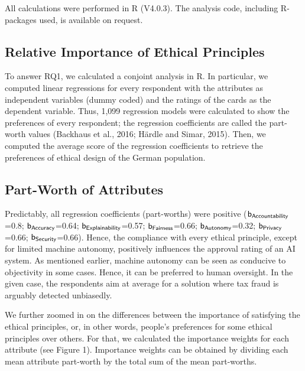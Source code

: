 \documentclass{article}
\begin{document}
All calculations were performed in R (V4.0.3). The analysis code,
including R-packages used, is available on request.

\hypertarget{relative-importance-of-ethical-principles}{%
\subsection{Relative Importance of Ethical
Principles}\label{relative-importance-of-ethical-principles}}

To answer RQ1, we calculated a conjoint analysis in R. In particular, we
computed linear regressions for every respondent with the attributes as
independent variables (dummy coded) and the ratings of the cards as the
dependent variable. Thus, 1,099 regression models were calculated to
show the preferences of every respondent; the regression coefficients
are called the part-worth values (Backhaus et al., 2016; Härdle and
Simar, 2015). Then, we computed the average score of the regression
coefficients to retrieve the preferences of ethical design of the German
population.

\hypertarget{part-worth-of-attributes}{%
\subsection{Part-Worth of Attributes}\label{part-worth-of-attributes}}

Predictably, all regression coefficients (part-worths) were positive
(\(\sf{b_{Accountability}}\)=0.8; \(\sf{b_{Accuracy}}\)=0.64;
\(\sf{b_{Explainability}}\)=0.57; \(\sf{b_{Fairness}}\)=0.66;
\(\sf{b_{Autonomy}}\)=0.32; \(\sf{b_{Privacy}}\)=0.66;
\(\sf{b_{Security}}\)=0.66). Hence, the compliance with every ethical
principle, except for limited machine autonomy, positively influences
the approval rating of an AI system. As mentioned earlier, machine
autonomy can be seen as conducive to objectivity in some cases. Hence,
it can be preferred to human oversight. In the given case, the
respondents aim at average for a solution where tax fraud is arguably
detected unbiasedly.

We further zoomed in on the differences between the importance of
satisfying the ethical principles, or, in other words, people's
preferences for some ethical principles over others. For that, we
calculated the importance weights for each attribute (see Figure 1).
Importance weights can be obtained by dividing each mean attribute
part-worth by the total sum of the mean part-worths.
\end{document}
